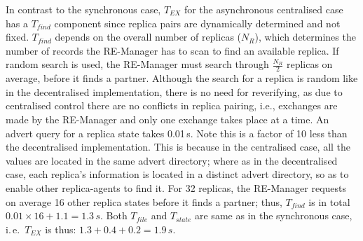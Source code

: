 \documentclass{rspublic}
\newcommand{\alnote}[1]{ {\textcolor{blue} { ***andre: #1 }}}
\newcommand{\athotanote}[1]{ {\textcolor{green} { ***athota: #1 }}}
\newcommand{\alnote}[1]{}
\newcommand{\athotanote}[1]{}
\begin{document}




In contrast to the synchronous case, $T_{EX}$ for the asynchronous
centralised case has a $T_{find}$ component since replica pairs are
dynamically determined and not fixed. $T_{find}$ depends on the overall
number of replicas ($N_R$), which determines the number of records the
RE-Manager has to scan to find an available replica. If random search is used,
the RE-Manager must search through $\frac{N_R}{2}$ replicas on average, before it
finds a partner. Although the search for a replica is random like in the
decentralised implementation, there is no need for reverifying, as due
to centralised control there are no conflicts in replica pairing,
i.e., exchanges are made by the RE-Manager and only one exchange takes
place at a time.  An advert query for a replica state takes
0.01\,s. Note this is a factor of 10 less than the decentralised
implementation. This is because in the centralised case, all the values are located in the same advert directory; where as in the decentralised case, each replica's information is located in a distinct advert directory, so as to enable other replica-agents to find it.  %
For 32 replicas, the RE-Manager requests on average 16 other replica
states before it finds a partner; thus, $T_{find}$ is in total
$0.01\times16+1.1=1.3\,s$. Both $T_{file}$ and $T_{state}$ are same as
in the synchronous case, i.\,e.\ $T_{EX}$ is thus:
$1.3+0.4+0.2=1.9\,s$.
\end{document}
